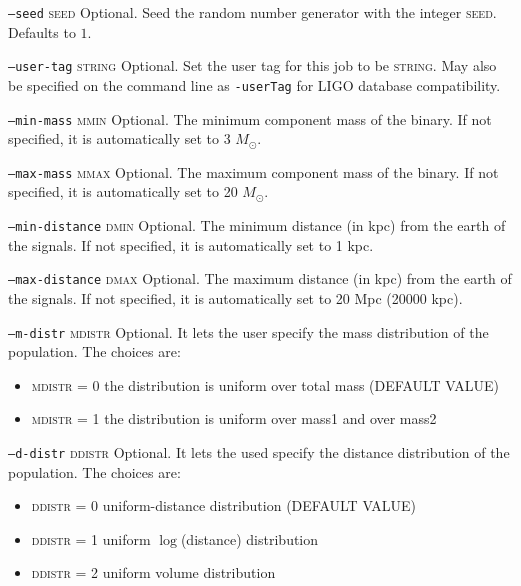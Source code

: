 \begin{entry}
\begin{entry}
\item[\texttt{--seed} \textsc{seed}]
Optional. Seed the random number generator with the integer \textsc{seed}.
Defaults to $1$.

\item[\texttt{--user-tag} \textsc{string}] Optional. Set the user tag for this
job to be \textsc{string}. May also be specified on the command line as 
\texttt{-userTag} for LIGO database compatibility.

\item[\texttt{--min-mass} \textsc{mmin}] Optional. The minimum component 
mass of the binary. If not specified, it is automatically set to 3 
$M_\odot$.

\item[\texttt{--max-mass} \textsc{mmax}] Optional. The maximum component 
mass of the binary. If not specified, it is automatically set to 20 
$M_\odot$.

\item[\texttt{--min-distance} \textsc{dmin}] Optional. The minimum distance
(in kpc) from the earth of the signals. If not specified, it is automatically 
set to 1 kpc.

\item[\texttt{--max-distance} \textsc{dmax}] Optional. The maximum distance
(in kpc) from the earth of the signals. If not specified, it is automatically 
set to 20 Mpc (20000 kpc).

\item[\texttt{--m-distr} \textsc{mdistr}] Optional. It lets the user specify
the mass distribution of the population. The choices are:
 \begin{itemize} 
 \item \textsc{mdistr} = 0 the distribution is uniform over total mass
 (DEFAULT VALUE)
 \item \textsc{mdistr} = 1 the distribution is uniform over mass1 and
    over mass2
 \end{itemize}

\item[\texttt{--d-distr} \textsc{ddistr}] Optional. It lets the used
specify the distance distribution of the population. The choices are:
 \begin{itemize} 
 \item \textsc{ddistr} = 0 uniform-distance distribution
 (DEFAULT VALUE)
 \item \textsc{ddistr} = 1 uniform $\log$(distance) distribution
 \item \textsc{ddistr} = 2 uniform volume distribution
 \end{itemize}


\end{entry}
\end{entry}

